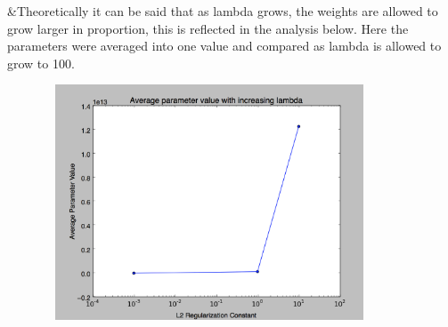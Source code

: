 \documentclass[letterpaper,10pt,titlepage]{article}
\begin{document}
\pagebreak

    &Theoretically it can be said that as lambda grows, the weights are allowed to grow larger in proportion, this is reflected in the analysis below.
    Here the parameters were averaged into one value and compared as lambda is allowed to grow to 100. 
    

    \includegraphics[width=12cm, height=7cm]{weights}
    
\pagebreak
\end{document}
